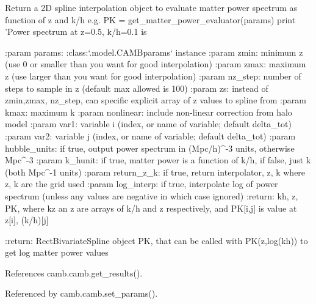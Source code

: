 \begin{DoxyVerb}Return a 2D spline interpolation object to evaluate matter power spectrum as function of z and k/h
e.g.
  PK = get_matter_power_evaluator(params)
  print 'Power spectrum at z=0.5, k/h=0.1 is %

:param params: :class:`.model.CAMBparams` instance
:param zmin: minimum z (use 0 or smaller than you want for good interpolation)
:param zmax: maximum z (use larger than you want for good interpolation)
:param nz_step: number of steps to sample in z (default max allowed is 100)
:param zs: instead of zmin,zmax, nz_step, can specific explicit array of z values to spline from
:param kmax: maximum k
:param nonlinear: include non-linear correction from halo model
:param var1: variable i (index, or name of variable; default delta_tot)
:param var2: variable j (index, or name of variable; default delta_tot)
:param hubble_units: if true, output power spectrum in (Mpc/h)^{-3} units, otherwise Mpc^{-3}
:param k_hunit: if true, matter power is a function of k/h, if false, just k (both Mpc^{-1} units)
:param return_z_k: if true, return interpolator, z, k where z, k are the grid used
:param log_interp: if true, interpolate log of power spectrum (unless any values are negative in which case ignored)
:return: kh, z, PK, where kz an z are arrays of k/h and z respectively, and PK[i,j] is value at z[i], (k/h)[j]

:return: RectBivariateSpline object PK, that can be called with PK(z,log(kh)) to get log matter power values
\end{DoxyVerb}
 

References camb.\+camb.\+get\+\_\+results().



Referenced by camb.\+camb.\+set\+\_\+params().

